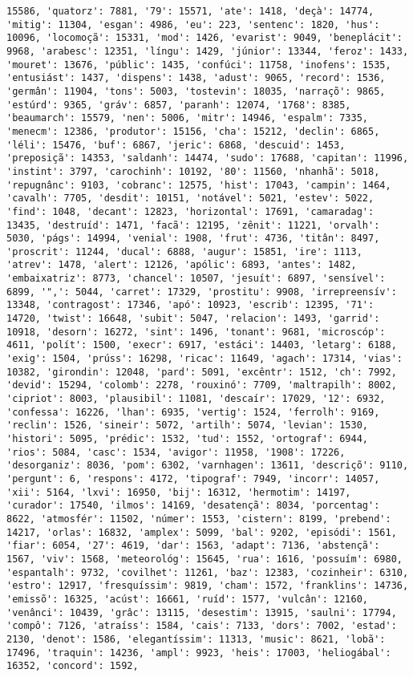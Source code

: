\documentclass[11pt]{article}
\begin{document}
\begin{Verbatim}[commandchars=\\\{\}]
15586, 'quatorz': 7881, '79': 15571, 'ate': 1418, 'deçà': 14774, 'mitig': 11304, 'esgan': 4986, 'eu': 223, 'sentenc': 1820, 'hus': 10096, 'locomoçã': 15331, 'mod': 1426, 'evarist': 9049, 'beneplácit': 9968, 'arabesc': 12351, 'língu': 1429, 'júnior': 13344, 'feroz': 1433, 'mouret': 13676, 'públic': 1435, 'confúci': 11758, 'inofens': 1535, 'entusiást': 1437, 'dispens': 1438, 'adust': 9065, 'record': 1536, 'germân': 11904, 'tons': 5003, 'tostevin': 18035, 'narraçõ': 9865, 'estúrd': 9365, 'gráv': 6857, 'paranh': 12074, '1768': 8385, 'beaumarch': 15579, 'nen': 5006, 'mitr': 14946, 'espalm': 7335, 'menecm': 12386, 'produtor': 15156, 'cha': 15212, 'declin': 6865, 'léli': 15476, 'buf': 6867, 'jeric': 6868, 'descuid': 1453, 'preposiçã': 14353, 'saldanh': 14474, 'sudo': 17688, 'capitan': 11996, 'instint': 3797, 'carochinh': 10192, '80': 11560, 'nhanhã': 5018, 'repugnânc': 9103, 'cobranc': 12575, 'hist': 17043, 'campin': 1464, 'cavalh': 7705, 'desdit': 10151, 'notável': 5021, 'estev': 5022, 'find': 1048, 'decant': 12823, 'horizontal': 17691, 'camaradag': 13435, 'destruíd': 1471, 'facã': 12195, 'zênit': 11221, 'orvalh': 5030, 'págs': 14994, 'venial': 1908, 'frut': 4736, 'titân': 8497, 'proscrit': 11244, 'ducal': 6888, 'augur': 15851, 'ire': 1113, 'atrev': 1478, 'alert': 12126, 'apólic': 6893, 'antes': 1482, 'embaixatriz': 8773, 'chancel': 10507, 'jesuít': 6897, 'sensível': 6899, '",': 5044, 'carret': 17329, 'prostitu': 9908, 'irrepreensív': 13348, 'contragost': 17346, 'apó': 10923, 'escrib': 12395, '71': 14720, 'twist': 16648, 'subit': 5047, 'relacion': 1493, 'garrid': 10918, 'desorn': 16272, 'sint': 1496, 'tonant': 9681, 'microscóp': 4611, 'polít': 1500, 'execr': 6917, 'estáci': 14403, 'letarg': 6188, 'exig': 1504, 'prúss': 16298, 'ricac': 11649, 'agach': 17314, 'vias': 10382, 'girondin': 12048, 'pard': 5091, 'excêntr': 1512, 'ch': 7992, 'devid': 15294, 'colomb': 2278, 'rouxinó': 7709, 'maltrapilh': 8002, 'cipriot': 8003, 'plausibil': 11081, 'descaír': 17029, '12': 6932, 'confessa': 16226, 'lhan': 6935, 'vertig': 1524, 'ferrolh': 9169, 'reclin': 1526, 'sineir': 5072, 'artilh': 5074, 'levian': 1530, 'histori': 5095, 'prédic': 1532, 'tud': 1552, 'ortograf': 6944, 'rios': 5084, 'casc': 1534, 'avigor': 11958, '1908': 17226, 'desorganiz': 8036, 'pom': 6302, 'varnhagen': 13611, 'descriçõ': 9110, 'pergunt': 6, 'respons': 4172, 'tipograf': 7949, 'incorr': 14057, 'xii': 5164, 'lxvi': 16950, 'bij': 16312, 'hermotim': 14197, 'curador': 17540, 'ilmos': 14169, 'desatençã': 8034, 'porcentag': 8622, 'atmosfér': 11502, 'númer': 1553, 'cistern': 8199, 'prebend': 14217, 'orlas': 16832, 'amplex': 5099, 'bal': 9202, 'episódi': 1561, 'fiar': 6054, '27': 4619, 'dar': 1563, 'adapt': 7136, 'abstençã': 1567, 'viv': 1568, 'meteorológ': 15645, 'rua': 1616, 'possuím': 6980, 'espantalh': 9732, 'covilhet': 11261, 'baz': 12383, 'cozinheir': 6310, 'estro': 12917, 'fresquíssim': 9819, 'cham': 1572, 'franklins': 14736, 'emissõ': 16325, 'acúst': 16661, 'ruíd': 1577, 'vulcân': 12160, 'venânci': 10439, 'grâc': 13115, 'desestim': 13915, 'saulni': 17794, 'compô': 7126, 'atraíss': 1584, 'cais': 7133, 'dors': 7002, 'estad': 2130, 'denot': 1586, 'elegantíssim': 11313, 'music': 8621, 'lobã': 17496, 'traquin': 14236, 'ampl': 9923, 'heis': 17003, 'heliogábal': 16352, 'concord': 1592, 
\end{Verbatim}
\end{document}

